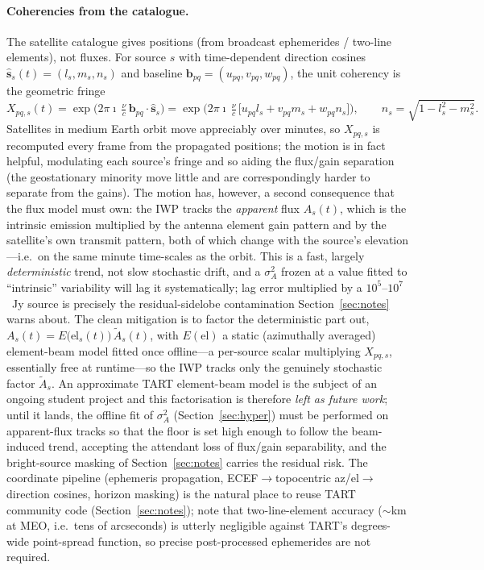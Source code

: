\documentclass[11pt]{article}
\begin{document}
\paragraph{Coherencies from the catalogue.} The satellite catalogue gives positions (from broadcast
ephemerides / two-line elements), not fluxes. For source $s$ with time-dependent direction cosines
$\hat{\bm{s}}_s(t)=(l_s,m_s,n_s)$ and baseline $\bm{b}_{pq}=(u_{pq},v_{pq},w_{pq})$, the unit
coherency is the geometric fringe
\begin{equation}
  X_{pq,s}(t)=\exp\!\Big(2\pi\imath\,\tfrac{\nu}{c}\,\bm{b}_{pq}\cdot\hat{\bm{s}}_s\Big)
  =\exp\!\Big(2\pi\imath\,\tfrac{\nu}{c}\,\big[u_{pq}l_s+v_{pq}m_s+w_{pq}n_s\big]\Big),
  \qquad n_s=\sqrt{1-l_s^2-m_s^2}.
\end{equation}
Satellites in medium Earth orbit move appreciably over minutes, so $X_{pq,s}$ is recomputed every
frame from the propagated positions; the motion is in fact helpful, modulating each source's fringe
and so aiding the flux/gain separation (the geostationary minority move little and are
correspondingly harder to separate from the gains). The motion has, however, a second consequence
that the flux model must own: the IWP tracks the \emph{apparent} flux $A_s(t)$, which is the
intrinsic emission multiplied by the antenna element gain pattern and by the satellite's own
transmit pattern, both of which change with the source's elevation---i.e.\ on the same
minute time-scales as the orbit. This is a fast, largely \emph{deterministic} trend, not slow
stochastic drift, and a $\sigma_A^2$ frozen at a value fitted to ``intrinsic'' variability will lag
it systematically; lag error multiplied by a $10^5$--$10^7$~Jy source is precisely the
residual-sidelobe contamination Section~\ref{sec:notes} warns about. The clean mitigation is to
factor the deterministic part out, $A_s(t)=E\big(\mathrm{el}_s(t)\big)\,\tilde A_s(t)$, with
$E(\mathrm{el})$ a static (azimuthally averaged) element-beam model fitted once offline---a
per-source scalar multiplying $X_{pq,s}$, essentially free at runtime---so the IWP tracks only the
genuinely stochastic factor $\tilde A_s$. An approximate TART element-beam model is the subject of
an ongoing student project and this factorisation is therefore \emph{left as future work}; until it
lands, the offline fit of $\sigma_A^2$ (Section~\ref{sec:hyper}) must be performed on apparent-flux
tracks so that the floor is set high enough to follow the beam-induced trend, accepting the
attendant loss of flux/gain separability, and the bright-source masking of Section~\ref{sec:notes}
carries the residual risk. The coordinate pipeline (ephemeris propagation,
ECEF$\to$topocentric az/el$\to$direction cosines, horizon masking) is the natural place to reuse TART
community code (Section~\ref{sec:notes}); note that two-line-element accuracy ($\sim$km at MEO,
i.e.\ tens of arcseconds) is utterly negligible against TART's degrees-wide point-spread function,
so precise post-processed ephemerides are not required.
\end{document}
